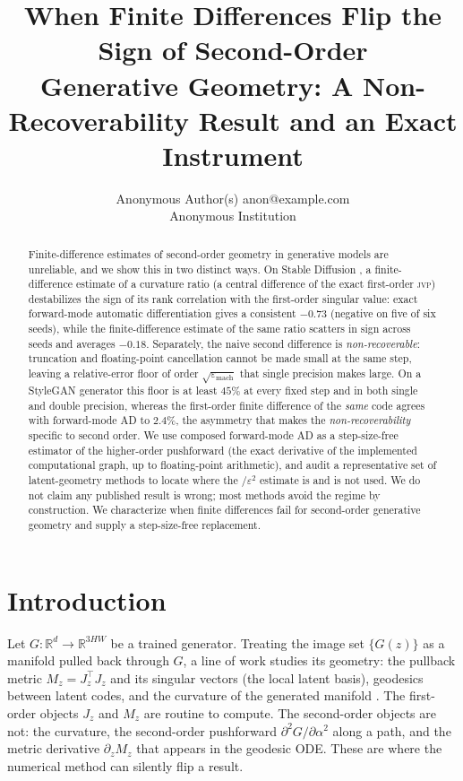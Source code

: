 \documentclass[10pt]{article} %
\title{When Finite Differences Flip the Sign of Second-Order\\
Generative Geometry: A Non-Recoverability Result and an Exact Instrument}
\author{\name Anonymous Author(s) \email anon@example.com \\
      \addr Anonymous Institution}
\newcommand{\R}{\mathbb{R}}
\newcommand{\jvp}{\textsc{jvp}}
\newcommand{\eps}{\varepsilon}
\begin{document}
\maketitle

\begin{abstract}
Finite-difference estimates of second-order geometry in generative models are
unreliable, and we show this in two distinct ways. On Stable Diffusion
\citep{rombach2022}, a finite-difference estimate of a curvature ratio (a central
difference of the exact first-order \jvp) destabilizes the sign of its rank
correlation with the first-order singular value: exact forward-mode automatic
differentiation gives a consistent $-0.73$ (negative on five of six seeds), while
the finite-difference estimate of the same ratio scatters in sign across seeds and
averages $-0.18$. Separately, the naive second difference is \emph{non-recoverable}:
truncation and floating-point cancellation cannot be made small at the same step,
leaving a relative-error floor of order $\sqrt{\eps_{\mathrm{mach}}}$ that single
precision makes large. On a StyleGAN generator \citep{karras2019} this floor is at
least $45\%$ at every fixed step and in both single and double precision, whereas
the first-order finite difference of the \emph{same} code agrees with forward-mode
AD to $2.4\%$, the asymmetry that makes the \emph{non-recoverability} specific to
second order. We use composed forward-mode AD as a
step-size-free estimator of the higher-order pushforward (the exact derivative of
the implemented computational graph, up to floating-point arithmetic), and audit a
representative set of latent-geometry methods to locate where the $/\eps^2$
estimate is and is not used. We do not claim any published result is wrong; most
methods avoid the regime by construction. We characterize when finite differences
fail for second-order generative geometry and supply a step-size-free replacement.
\end{abstract}

\section{Introduction}
Let $G:\R^{d}\to\R^{3HW}$ be a trained generator. Treating the image set
$\{G(z)\}$ as a manifold pulled back through $G$, a line of work studies its
geometry: the pullback metric $M_z=J_z^\top J_z$ and its singular vectors (the
local latent basis), geodesics between latent codes, and the curvature of the
generated manifold \citep{arvanitidis2018,shao2018,chen2018,park2023,saito2025}.
The first-order objects $J_z$ and $M_z$ are routine to compute. The second-order
objects are not: the curvature, the second-order pushforward
$\partial^2 G/\partial\alpha^2$ along a path, and the metric derivative
$\partial_z M_z$ that appears in the geodesic ODE. These are where the numerical
method can silently flip a result.
\end{document}
